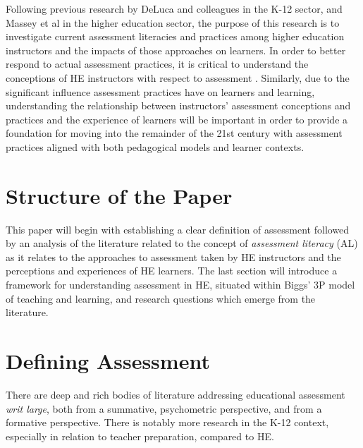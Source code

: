 \documentclass[
]{book}
\begin{document}
Following previous research by DeLuca and colleagues \citep{delucaTeachersApproachesClassroom2016, delucaExploringAssessmentCultures2021, delucaApproachesClassroomAssessment2016} in the K-12 sector, and Massey et al \citeyearpar{masseyAssessmentLiteracyCollege2020} in the higher education sector, the purpose of this research is to investigate current assessment literacies and practices among higher education instructors and the impacts of those approaches on learners. In order to better respond to actual assessment practices, it is critical to understand the conceptions of HE instructors with respect to assessment \citep{delucaExploringAssessmentCultures2021, offerdahlChangesInstructorsAssessment2011}. Similarly, due to the significant influence assessment practices have on learners and learning, understanding the relationship between instructors' assessment conceptions and practices and the experience of learners will be important in order to provide a foundation for moving into the remainder of the 21st century with assessment practices aligned with both pedagogical models and learner contexts.

\hypertarget{structure-of-the-paper}{%
\section{Structure of the Paper}\label{structure-of-the-paper}}

This paper will begin with establishing a clear definition of assessment followed by an analysis of the literature related to the concept of \emph{assessment literacy} (AL) \citep{delucaDifferentialSituatedView2019} as it relates to the approaches to assessment \citep{delucaApproachesClassroomAssessment2016} taken by HE instructors and the perceptions and experiences of HE learners. The last section will introduce a framework for understanding assessment in HE, situated within Biggs' \citetext{\citeyear{biggsWhatStudentDoes1999}; \citeyear{biggsTheoryPracticeCognitive1993}} 3P model of teaching and learning, and research questions which emerge from the literature.

\hypertarget{defining-assessment}{%
\section{Defining Assessment}\label{defining-assessment}}

There are deep and rich bodies of literature addressing educational assessment \emph{writ large}, both from a summative, psychometric perspective, and from a formative perspective. There is notably more research in the K-12 context, especially in relation to teacher preparation, compared to HE.
\end{document}
